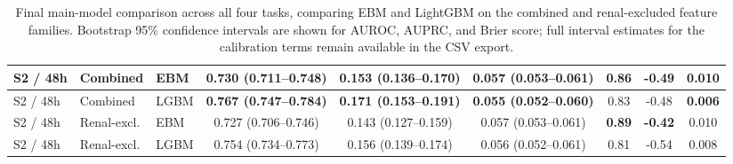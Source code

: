 \begin{table}[H]
{\begin{tabular}{ | l | l | l | c | c | c | c | c | c | }
\hline
S2 / 48h & Combined & EBM & 0.730 (0.711--0.748) & 0.153 (0.136--0.170) & 0.057 (0.053--0.061) & 0.86 & -0.49 & 0.010 \\
\hline
S2 / 48h & Combined & LGBM & \textbf{0.767 (0.747--0.784)} & \textbf{0.171 (0.153--0.191)} & \textbf{0.055 (0.052--0.060)} & 0.83 & -0.48 & \textbf{0.006} \\
\hline
S2 / 48h & Renal-excl. & EBM & 0.727 (0.706--0.746) & 0.143 (0.127--0.159) & 0.057 (0.053--0.061) & \textbf{0.89} & \textbf{-0.42} & 0.010 \\
\hline
S2 / 48h & Renal-excl. & LGBM & 0.754 (0.734--0.773) & 0.156 (0.139--0.174) & 0.056 (0.052--0.061) & 0.81 & -0.54 & 0.008 \\
\hline
\end{tabular}
}
\caption{Final main-model comparison across all four tasks, comparing EBM and LightGBM on the combined and renal-excluded feature families. Bootstrap 95\% confidence intervals are shown for AUROC, AUPRC, and Brier score; full interval estimates for the calibration terms remain available in the CSV export.}
\label{tab:main_model_results}
\end{table}
